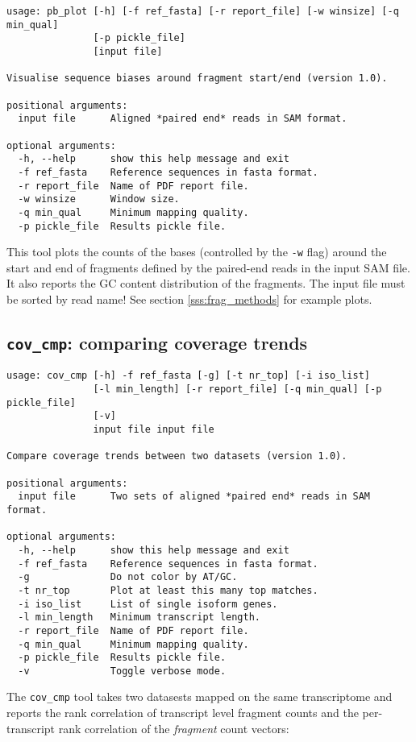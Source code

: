 \begin{verbatim}
usage: pb_plot [-h] [-f ref_fasta] [-r report_file] [-w winsize] [-q min_qual]
               [-p pickle_file]
               [input file]

Visualise sequence biases around fragment start/end (version 1.0).

positional arguments:
  input file      Aligned *paired end* reads in SAM format.

optional arguments:
  -h, --help      show this help message and exit
  -f ref_fasta    Reference sequences in fasta format.
  -r report_file  Name of PDF report file.
  -w winsize      Window size.
  -q min_qual     Minimum mapping quality.
  -p pickle_file  Results pickle file.
\end{verbatim}

This tool plots the counts of the bases (controlled by the \texttt{-w} flag) around the start and end of fragments defined by the paired-end reads in the input SAM file. It also reports the GC content distribution of the fragments. The input file must be sorted by read name!
See section \ref{sss:frag_methods} for example plots.

\subsection{{\tt cov\_cmp}: comparing coverage trends}

\begin{verbatim}
usage: cov_cmp [-h] -f ref_fasta [-g] [-t nr_top] [-i iso_list]
               [-l min_length] [-r report_file] [-q min_qual] [-p pickle_file]
               [-v]
               input file input file

Compare coverage trends between two datasets (version 1.0).

positional arguments:
  input file      Two sets of aligned *paired end* reads in SAM format.

optional arguments:
  -h, --help      show this help message and exit
  -f ref_fasta    Reference sequences in fasta format.
  -g              Do not color by AT/GC.
  -t nr_top       Plot at least this many top matches.
  -i iso_list     List of single isoform genes.
  -l min_length   Minimum transcript length.
  -r report_file  Name of PDF report file.
  -q min_qual     Minimum mapping quality.
  -p pickle_file  Results pickle file.
  -v              Toggle verbose mode.
\end{verbatim}

The \texttt{cov\_cmp} tool takes two datasests mapped on the same transcriptome and reports the rank correlation of transcript level fragment counts and the per-transcript rank correlation of the \emph{fragment} count vectors:

